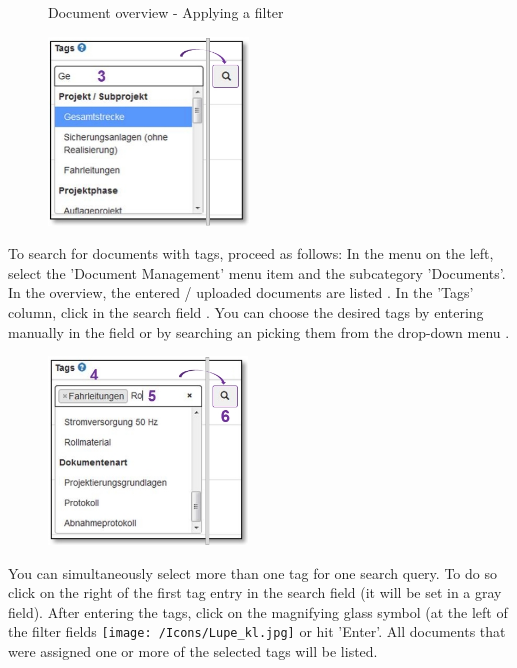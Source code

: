 \begin{figure}[H]
\caption{Document overview - Applying a filter}
\end{figure}

\begin{figure}
\vspace{-30pt}
\includegraphics[height=50mm]{../chapters/11_Dokumentenablage/pictures/11-2-8_DokTagHinzufuegen.jpg}
\end{figure}
To search for documents with tags, proceed as follows:
In the menu on the left, select the 'Document Management' menu item and the subcategory 'Documents'. In the overview, the entered / uploaded documents are listed . In the 'Tags' column, click in the search field . You can choose the desired tags by entering manually in the field or by searching an picking them from the drop-down menu .

\vspace{\baselineskip}

\begin{figure}
\vspace{-30pt}
\includegraphics[height=50mm]{../chapters/11_Dokumentenablage/pictures/11-2-8_TagEingabe.jpg}
\end{figure}
You can simultaneously select more than one tag for one search query. To do so click on the right of the first tag entry  in the search field  (it will be set in a gray field). After entering the tags, click on the magnifying glass symbol (at the left of the filter fields \texttt{[image: /Icons/Lupe\_kl.jpg]}  or hit 'Enter'. All documents that were assigned one or more of the selected tags will be listed.


